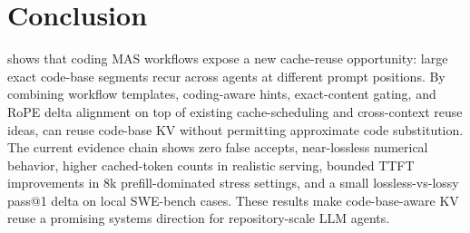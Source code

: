 \section{Conclusion}

\system shows that coding MAS workflows expose a new cache-reuse opportunity: large exact code-base segments recur across agents at different prompt positions.
By combining workflow templates, coding-aware hints, exact-content gating, and RoPE delta alignment on top of existing cache-scheduling and cross-context reuse ideas, \system can reuse code-base KV without permitting approximate code substitution.
The current evidence chain shows zero false accepts, near-lossless numerical behavior, higher cached-token counts in realistic serving, bounded TTFT improvements in 8k prefill-dominated stress settings, and a small lossless-vs-lossy pass@1 delta on local SWE-bench cases.
These results make code-base-aware KV reuse a promising systems direction for repository-scale LLM agents.
